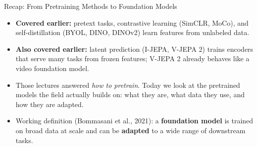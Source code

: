 \begin{frame}{Recap: From Pretraining Methods to Foundation Models}
  \begin{itemize}\itemsep0.3em
    \item \textbf{Covered earlier:} pretext tasks, contrastive learning (SimCLR, MoCo), and self-distillation (BYOL, DINO, DINOv2) learn features from unlabeled data.
    \item \textbf{Also covered earlier:} latent prediction (I-JEPA, V-JEPA 2) trains encoders that serve many tasks from frozen features; V-JEPA 2 already behaves like a video foundation model.
    \item Those lectures answered \emph{how to pretrain}. Today we look at the pretrained models the field actually builds on: what they are, what data they use, and how they are adapted.
    \item Working definition (Bommasani et al., 2021): a \textbf{foundation model} is trained on broad data at scale and can be \textbf{adapted} to a wide range of downstream tasks.
  \end{itemize}
\end{frame}
